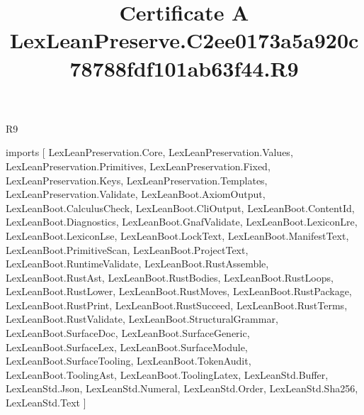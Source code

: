 \begin{lexlean}{R9}
\title{Certificate A LexLeanPreserve.C2ee0173a5a920c78788fdf101ab63f44.R9}
\begin{coremodule}
imports [
  LexLeanPreservation.Core,
  LexLeanPreservation.Values,
  LexLeanPreservation.Primitives,
  LexLeanPreservation.Fixed,
  LexLeanPreservation.Keys,
  LexLeanPreservation.Templates,
  LexLeanPreservation.Validate,
  LexLeanBoot.AxiomOutput,
  LexLeanBoot.CalculusCheck,
  LexLeanBoot.CliOutput,
  LexLeanBoot.ContentId,
  LexLeanBoot.Diagnostics,
  LexLeanBoot.GnafValidate,
  LexLeanBoot.LexiconLre,
  LexLeanBoot.LexiconLse,
  LexLeanBoot.LockText,
  LexLeanBoot.ManifestText,
  LexLeanBoot.PrimitiveScan,
  LexLeanBoot.ProjectText,
  LexLeanBoot.RuntimeValidate,
  LexLeanBoot.RustAssemble,
  LexLeanBoot.RustAst,
  LexLeanBoot.RustBodies,
  LexLeanBoot.RustLoops,
  LexLeanBoot.RustLower,
  LexLeanBoot.RustMoves,
  LexLeanBoot.RustPackage,
  LexLeanBoot.RustPrint,
  LexLeanBoot.RustSucceed,
  LexLeanBoot.RustTerms,
  LexLeanBoot.RustValidate,
  LexLeanBoot.StructuralGrammar,
  LexLeanBoot.SurfaceDoc,
  LexLeanBoot.SurfaceGeneric,
  LexLeanBoot.SurfaceLex,
  LexLeanBoot.SurfaceModule,
  LexLeanBoot.SurfaceTooling,
  LexLeanBoot.TokenAudit,
  LexLeanBoot.ToolingAst,
  LexLeanBoot.ToolingLatex,
  LexLeanStd.Buffer,
  LexLeanStd.Json,
  LexLeanStd.Numeral,
  LexLeanStd.Order,
  LexLeanStd.Sha256,
  LexLeanStd.Text
]


\end{coremodule}
\end{lexlean}
